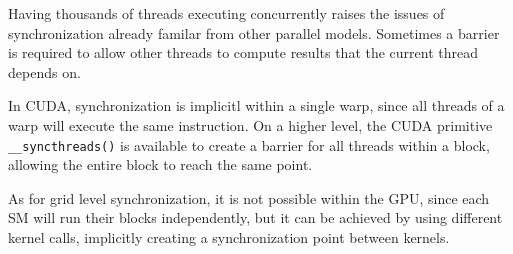 Having thousands of threads executing concurrently raises the issues of synchronization already familar from other parallel models. Sometimes a barrier is required to allow other threads to compute results that the current thread depends on.

In CUDA, synchronization is implicitl within a single warp, since all threads of a warp will execute the same instruction. On a higher level, the CUDA primitive \texttt{\_\_syncthreads()} is available to create a barrier for all threads within a block, allowing the entire block to reach the same point.

As for grid level synchronization, it is not possible within the GPU, since each SM will run their blocks independently, but it can be achieved by using different kernel calls, implicitly creating a synchronization point between kernels.